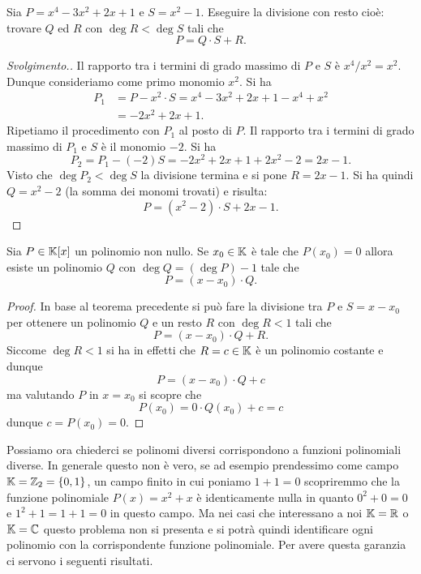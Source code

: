   \begin{exercise}
  Sia $P = x^4-3 x^2 + 2x + 1$ e $S = x^2-1$.
  Eseguire la divisione con resto cioè:
  trovare $Q$ ed $R$ con $\deg R < \deg S$ tali che
  \[
  P = Q \cdot S + R.
  \]
  \end{exercise}
  \begin{proof}[Svolgimento.]
  Il rapporto tra i termini di grado massimo di
  $P$ e $S$ è $x^4/x^2 = x^2$.
  Dunque consideriamo come primo monomio $x^2$.
  Si ha
  \begin{align*}
    P_1
    &= P - x^2 \cdot S
    = x^4-3x^2+2x+1 - x^4+x^2 \\
    &= -2x^2+2x+1.
  \end{align*}
  Ripetiamo il procedimento con $P_1$ al posto di $P$.
  Il rapporto tra i termini di grado massimo di $P_1$ e $S$
  è il monomio $-2$. Si ha
  \[
    P_2 = P_1 - (-2) S = -2x^2 + 2x + 1 + 2x^2 - 2 = 2x -1.
  \]
  Visto che $\deg P_2 < \deg S$ la divisione termina e
  si pone $R = 2x-1$.
  Si ha quindi $Q = x^2 - 2$ (la somma dei monomi trovati)
  e risulta:
  \[
    P = (x^2 - 2)\cdot S + 2x -1.
  \]
  \end{proof}
  
  \begin{theorem}[Ruffini]
  \label{th:Ruffini}%
  Sia $P\in {\mathbb K}[x]$ un polinomio non nullo.
  Se $x_0 \in {\mathbb K}$ è tale che $P(x_0)=0$
  allora esiste un polinomio $Q$ con $\deg Q = (\deg P) - 1$
  tale che
  \[
    P = (x-x_0)\cdot Q.
  \]
  \end{theorem}
  \begin{proof}
  In base al teorema precedente si può fare la divisione tra
  $P$ e $S = x - x_0$ per ottenere un polinomio $Q$ e un resto
  $R$ con $\deg R < 1$ tali che
  \[
    P = (x-x_0)\cdot Q + R.
  \]
  Siccome $\deg R < 1$ si ha in effetti che $R=c\in {\mathbb K}$
  è un polinomio costante e dunque
  \[
    P = (x-x_0) \cdot Q + c
  \]
  ma valutando $P$ in $x=x_0$ si scopre che
  \[
   P(x_0) = 0\cdot Q(x_0) + c = c
  \]
  dunque $c=P(x_0) = 0$.
  \end{proof}
  
  Possiamo ora chiederci se polinomi diversi corrispondono
  a funzioni polinomiali diverse.
  In generale questo non è vero, se ad esempio prendessimo
  come campo ${\mathbb K}={\mathbb Z}_2 = {\left\{ 0,1 \right\}}$, un campo finito
  in cui poniamo $1+1=0$ scopriremmo che la funzione polinomiale
  $P(x) = x^2+x$ è identicamente nulla in quanto $0^2+0=0$
  e $1^2+1=1+1=0$ in questo campo.
  Ma nei casi che interessano a noi ${\mathbb K}={\mathbb R}$ o ${\mathbb K}={\mathbb C}$
  questo problema non si presenta e si potrà quindi identificare
  ogni polinomio con la corrispondente funzione polinomiale.
  Per avere questa garanzia ci servono i seguenti risultati.
  
